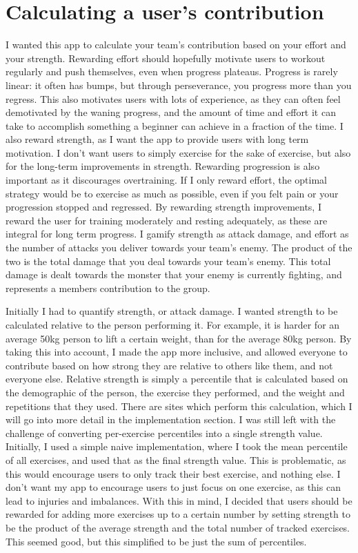 \documentclass{l4proj}
\begin{document}
\section{Calculating a user's contribution}
I wanted this app to calculate your team's contribution based on your effort and your strength. Rewarding effort should hopefully motivate users to workout regularly and push themselves, even when progress plateaus. Progress is rarely linear: it often has bumps, but through perseverance, you progress more than you regress. This also motivates users with lots of experience, as they can often feel demotivated by the waning progress, and the amount of time and effort it can take to accomplish something a beginner can achieve in a fraction of the time. I also reward strength, as I want the app to provide users with long term motivation. I don't want users to simply exercise for the sake of exercise, but also for the long-term improvements in strength. Rewarding progression is also important as it discourages overtraining. If I only reward effort, the optimal strategy would be to exercise as much as possible, even if you felt pain or your progression stopped and regressed. By rewarding strength improvements, I reward the user for training moderately and resting adequately, as these are integral for long term progress. I gamify strength as attack damage, and effort as the number of attacks you deliver towards your team's enemy. The product of the two is the total damage that you deal towards your team's enemy. This total damage is dealt towards the monster that your enemy is currently fighting, and represents a members contribution to the group.

Initially I had to quantify strength, or attack damage. I wanted strength to be calculated relative to the person performing it. For example, it is harder for an average 50kg person to lift a certain weight, than for the average 80kg person. By taking this into account, I made the app more inclusive, and allowed everyone to contribute based on how strong they are relative to others like them, and not everyone else. Relative strength is simply a percentile that is calculated based on the demographic of the person, the exercise they performed, and the weight and repetitions that they used. There are sites which perform this calculation, which I will go into more detail in the implementation section. I was still left with the challenge of converting per-exercise percentiles into a single strength value. Initially, I used a simple naive implementation, where I took the mean percentile of all exercises, and used that as the final strength value. This is problematic, as this would encourage users to only track their best exercise, and nothing else. I don't want my app to encourage users to just focus on one exercise, as this can lead to injuries and imbalances. With this in mind, I decided that users should be rewarded for adding more exercises up to a certain number by setting strength to be the product of the average strength and the total number of tracked exercises. This seemed good, but this simplified to be just the sum of percentiles.
\end{document}
